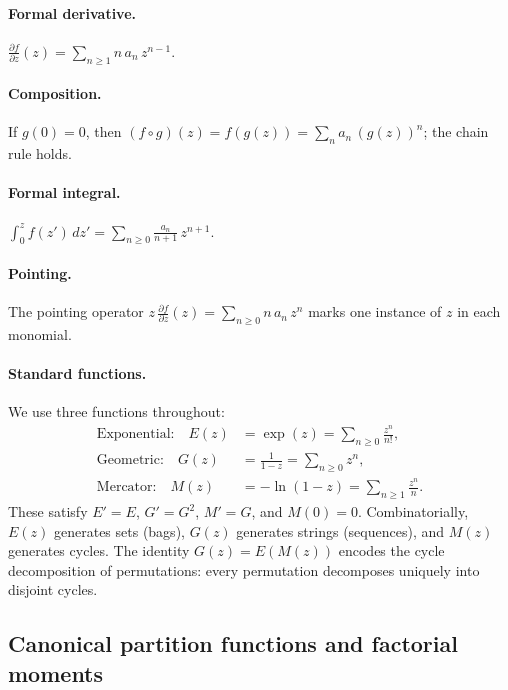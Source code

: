 \documentclass[11pt]{amsart}
\newcommand{\PDeriv}[2]{\frac{\partial #1}{\partial #2}}
\theoremstyle{definition}
\theoremstyle{plain}
\theoremstyle{remark}
\begin{document}
\paragraph{Formal derivative.}
$\PDeriv{f}{z}(z) = \sum_{n\ge 1} n\,a_n\,z^{n-1}$.

\paragraph{Composition.}
If $g(0)=0$, then $(f\circ g)(z) = f(g(z)) = \sum_n a_n\,(g(z))^n$; the chain rule holds.

\paragraph{Formal integral.}
$\int_0^z f(z')\,dz' = \sum_{n\ge 0} \frac{a_n}{n+1}\,z^{n+1}$.

\paragraph{Pointing.}
The pointing operator $z\,\PDeriv{f}{z}(z) = \sum_{n\ge 0} n\,a_n\,z^n$ marks one instance of $z$ in each monomial.

\paragraph{Standard functions.}
We use three functions throughout:
\begin{align}
\text{Exponential:}\quad E(z) &= \exp(z) = \textstyle\sum_{n\ge 0}\frac{z^n}{n!}, \label{eq:exponential_fps}\\
\text{Geometric:}\quad G(z) &= \frac{1}{1-z} = \textstyle\sum_{n\ge 0} z^n, \label{eq:geometric_fps}\\
\text{Mercator:}\quad M(z) &= -\ln(1-z) = \textstyle\sum_{n\ge 1}\frac{z^n}{n}. \label{eq:mercator_fps}
\end{align}
These satisfy $E'=E$, $G'=G^2$, $M'=G$, and $M(0)=0$.
Combinatorially, $E(z)$ generates sets (bags), $G(z)$ generates strings (sequences), and $M(z)$ generates cycles.
The identity $G(z) = E(M(z))$ encodes the cycle decomposition of permutations: every permutation decomposes uniquely into disjoint cycles.

\subsection{Canonical partition functions and factorial moments}
\label{sec:gf_canonical}
\end{document}
